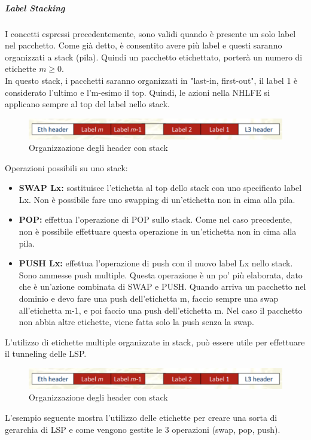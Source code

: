 \documentclass{article}
\begin{document}
\subparagraph{Label Stacking} I concetti espressi precedentemente, sono validi quando è presente un solo label nel pacchetto. Come già detto, è consentito avere più label e questi saranno organizzati a stack (pila). Quindi un pacchetto etichettato, porterà un numero di etichette $m \geq 0$. \\ In questo stack, i pacchetti saranno organizzati in "last-in, first-out", il label 1 è considerato l'ultimo e l'm-esimo il top. Quindi, le azioni nella NHLFE si applicano sempre al top del label nello stack.
\begin{figure}[H]
    \centering
    \includegraphics[scale=0.4]{figures/organizzazione header stack.png}
    \caption{Organizzazione degli header con stack}
\end{figure}
Operazioni possibili su uno stack:
\begin{itemize}
    \item \textbf{SWAP Lx:} sostituisce l'etichetta al top dello stack con uno specificato label Lx. Non è possibile fare uno swapping di un'etichetta non in cima alla pila.
    \item \textbf{POP:} effettua l'operazione di POP sullo stack. Come nel caso precedente, non è possibile effettuare questa operazione in un'etichetta non in cima alla pila.
    \item \textbf{PUSH Lx:} effettua l'operazione di push con il nuovo label Lx nello stack. Sono ammesse push multiple. Questa operazione è un po' più elaborata, dato che è un'azione combinata di SWAP e PUSH. Quando arriva un pacchetto nel dominio e devo fare una push dell'etichetta m, faccio sempre una swap all'etichetta m-1, e poi faccio una push dell'etichetta m. Nel caso il pacchetto non abbia altre etichette, viene fatta solo la push senza la swap.
\end{itemize}
L'utilizzo di etichette multiple organizzate in stack, può essere utile per effettuare il tunneling delle LSP.
\begin{figure}[H]
    \centering
    \includegraphics[scale=0.4]{figures/organizzazione header stack.png}
    \caption{Organizzazione degli header con stack}
\end{figure}
L'esempio seguente mostra l'utilizzo delle etichette per creare una sorta di gerarchia di LSP e come vengono gestite le 3 operazioni (swap, pop, push). 
\end{document}
